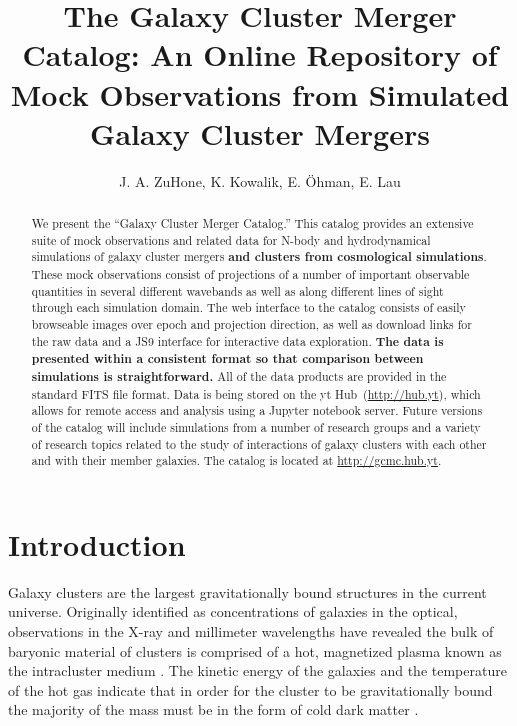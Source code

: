 \documentclass{emulateapj}
\begin{document}
\title{The Galaxy Cluster Merger Catalog: An Online Repository of Mock Observations from Simulated Galaxy Cluster Mergers}

\author{J. A. ZuHone, K. Kowalik, E. \"{O}hman, E. Lau}


\begin{abstract}
We present the ``Galaxy Cluster Merger Catalog.'' This catalog provides an extensive suite of mock observations and related data for N-body and hydrodynamical simulations of galaxy cluster mergers {\bf and clusters from cosmological simulations}. These mock observations consist of projections of a number of important observable quantities in several different wavebands as well as along different lines of sight through each simulation domain. The web interface to the catalog consists of easily browseable images over epoch and projection direction, as well as download links for the raw data and a JS9 interface for interactive data exploration. {\bf The data is presented within a consistent format so that comparison between simulations is straightforward.} All of the data products are provided in the standard FITS file format. Data is being stored on the yt Hub~(\url{http://hub.yt}), which allows for remote access and analysis using a Jupyter notebook server. Future versions of the catalog will include simulations from a number of research groups and a variety of research topics related to the study of interactions of galaxy clusters with each other and with their member galaxies. The catalog is located at \url{http://gcmc.hub.yt}.
\end{abstract}


\section{Introduction}\label{sec:intro}

Galaxy clusters are the largest gravitationally bound structures in the current universe. Originally identified as concentrations of galaxies in the optical, observations in the X-ray and millimeter wavelengths have revealed the bulk of baryonic material of clusters is comprised of a hot, magnetized plasma known as the intracluster medium \citep[ICM,][]{for72,sun72}. The kinetic energy of the galaxies and the temperature of the hot gas indicate that in order for the cluster to be gravitationally bound the majority of the mass must be in the form of cold dark matter \citep[CDM, first noted by][]{zwi37}.
\end{document}

